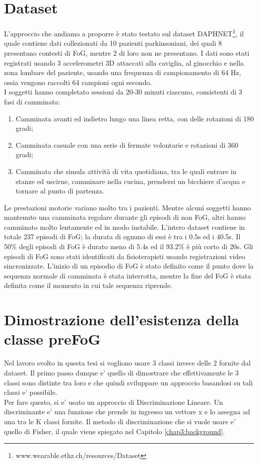 \section{Dataset}
L'approccio che andiamo a proporre è stato testato sul dataset DAPHNET\footnote{www.wearable.ethz.ch/resources/Dataset}, il quale contiene dati collezionati da 10 pazienti parkinsoniani, dei quali 8 presentano contesti di FoG, mentre 2 di loro non ne presentano. I dati sono stati registrati usando 3 accelerometri 3D attaccati alla caviglia, al ginocchio e nella zona lombare del paziente, usando una frequenza di campionamento di 64 Hz, ossia vengono raccolti 64 campioni ogni secondo.\\
I soggetti hanno completato sessioni da 20-30 minuti ciascuno, consistenti di 3 fasi di camminata:
\begin{enumerate}
	\item Camminata avanti ed indietro lungo una linea retta, con delle rotazioni di 180 gradi;
	\item Camminata casuale con una serie di fermate volontarie e rotazioni di 360 gradi;
	\item Camminata che simula attività di vita quotidiana, tra le quali entrare in stanze ed uscirne, camminare nella cucina, prendersi un bicchiere d'acqua e tornare al punto di partenza.
\end{enumerate}
Le prestazioni motorie variano molto tra i pazienti. Mentre alcuni soggetti hanno mantenuto una camminata regolare durante gli episodi di non FoG, altri hanno camminato molto lentamente ed in modo instabile. L'intero dataset contiene in totale 237 episodi di FoG; la durata di ognuno di essi è tra i 0.5s ed i 40.5s. Il 50\% degli episodi di FoG è durato meno di 5.4s ed il 93.2\% è più corto di 20s. Gli episodi di FoG sono stati identificati da fisioterapisti usando registrazioni video sincronizzate. L'inizio di un episodio di FoG è stato definito come il punto dove la sequenza normale di camminata è stata interrotta, mentre la fine del FoG è stata definita come il momento in cui tale sequenza riprende.

\section{Dimostrazione dell'esistenza della classe preFoG}
Nel lavoro svolto in questa tesi si vogliono usare 3 classi invece delle 2 fornite dal dataset. Il primo passo dunque e' quello di dimostrare che effettivamente le 3 classi sono distinte tra loro e che quindi sviluppare un approccio basandosi su tali classi e' possibile.\\
Per fare questo, si e' usato un approccio di Discriminazione Lineare. Un discriminante e' una funzione che prende in ingresso un vettore x e lo assegna ad una tra le K classi fornite. Il metodo di discriminazione che si vuole usare e' quello di Fisher, il quale viene spiegato nel Capitolo \ref{chap3:background}.\\
